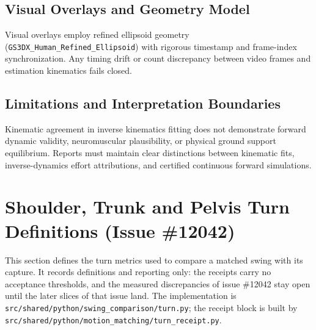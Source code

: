 \documentclass[11pt,a4paper]{article}
\begin{document}
\subsection{Visual Overlays and Geometry Model}
Visual overlays employ refined ellipsoid geometry (\texttt{GS3DX\_Human\_Refined\_Ellipsoid}) with rigorous timestamp and frame-index synchronization. Any timing drift or count discrepancy between video frames and estimation kinematics fails closed.

\subsection{Limitations and Interpretation Boundaries}
Kinematic agreement in inverse kinematics fitting does not demonstrate forward dynamic validity, neuromuscular plausibility, or physical ground support equilibrium. Reports must maintain clear distinctions between kinematic fits, inverse-dynamics effort attributions, and certified continuous forward simulations.

\section{Shoulder, Trunk and Pelvis Turn Definitions (Issue \#12042)}
\label{sec:turn_definitions}

This section defines the turn metrics used to compare a matched swing with its capture. It records definitions and reporting only: the receipts carry no acceptance thresholds, and the measured discrepancies of issue \#12042 stay open until the later slices of that issue land. The implementation is \texttt{src/shared/python/swing\_comparison/turn.py}; the receipt block is built by \texttt{src/shared/python/motion\_matching/turn\_receipt.py}.
\end{document}
